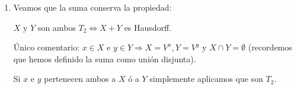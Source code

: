 \begin{demo}
\begin{enumerate}
    \item Veamos que la suma conserva la propiedad:

    $X$ y $Y$ son ambos $T_2 \Leftrightarrow X + Y$ es Hausdorff.

    Único comentario: $x \in X$ e $y \in Y \Rightarrow X = V^x, Y = V^y$ y $X \cap Y = \emptyset$ (recordemos que hemos definido la suma como unión disjunta).

    Si $x$ e $y$ pertenecen ambos a $X$ ó a $Y$ simplemente aplicamos que son $T_2$.
\end{enumerate}    
\end{demo}
